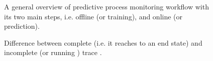 \begin{figure}[htb]
	\begin{center}
		\caption[Predictive process monitoring workflow]{A general overview of predictive process monitoring workflow with its two main steps, i.e. offline (or training), and online (or prediction).}
		\label{fig:pmwf}
	\end{center}
\end{figure}

\begin{figure}[htb]
	\begin{center}
		\caption[Complete and incomplete trace]{Difference between complete (i.e. it reaches to an end state) and incomplete (or running ) trace \cite{teinemaa2019outcome}.}
		\label{fig:runtr}
	\end{center}
\end{figure}

